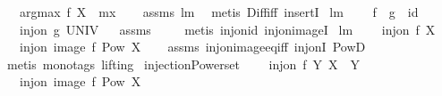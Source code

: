 \begin{isabellebody}
\ \ \ {\isachardoublequoteopen}argmax\ f\ X\ {\isacharequal}\ {\isacharbraceleft}mx{\isacharbraceright}{\isachardoublequoteclose}\isanewline
%
\isadelimproof
\ \ %
\endisadelimproof
%
\isatagproof
{}\isamarkupfalse%
\ assms\ lm{}{}{}\ \isamarkupfalse%
\ {\isacharparenleft}metis\ Diff{\isacharunderscore}iff\ insertI{}{\isacharparenright}%
\endisatagproof
{\isafoldproof}%
%
\isadelimproof
\isanewline
%
\endisadelimproof
\isanewline
{}\isamarkupfalse%
\ lm{}{}{}{\isacharcolon}\ \isanewline
\ \ \ {\isachardoublequoteopen}f\ {\isasymcirc}\ g\ {\isacharequal}\ id{\isachardoublequoteclose}\ \isanewline
\ \ \ {\isachardoublequoteopen}inj{\isacharunderscore}on\ g\ UNIV{\isachardoublequoteclose}%
\isadelimproof
\ %
\endisadelimproof
%
\isatagproof
{}\isamarkupfalse%
\ assms\ \isanewline
\ \ \isamarkupfalse%
\ {\isacharparenleft}metis\ inj{\isacharunderscore}on{\isacharunderscore}id\ inj{\isacharunderscore}on{\isacharunderscore}imageI{}{\isacharparenright}%
\endisatagproof
{\isafoldproof}%
%
\isadelimproof
%
\endisadelimproof
\isanewline
\isanewline
\isanewline
{}\isamarkupfalse%
\ lm{}{}{}{\isacharcolon}\ \isanewline
\ \ \ {\isachardoublequoteopen}inj{\isacharunderscore}on\ f\ X{\isachardoublequoteclose}\ \isanewline
\ \ \ {\isachardoublequoteopen}inj{\isacharunderscore}on\ {\isacharparenleft}image\ f{\isacharparenright}\ {\isacharparenleft}Pow\ X{\isacharparenright}{\isachardoublequoteclose}\isanewline
%
\isadelimproof
\ \ %
\endisadelimproof
%
\isatagproof
{}\isamarkupfalse%
\ assms\ inj{\isacharunderscore}on{\isacharunderscore}image{\isacharunderscore}eq{\isacharunderscore}iff\ inj{\isacharunderscore}onI\ PowD\ \isamarkupfalse%
\ {\isacharparenleft}metis\ {\isacharparenleft}mono{\isacharunderscore}tags{\isacharcomma}\ lifting{\isacharparenright}{\isacharparenright}%
\endisatagproof
{\isafoldproof}%
%
\isadelimproof
\isanewline
%
\endisadelimproof
\isanewline
{}\isamarkupfalse%
\ injectionPowerset{\isacharcolon}\ \isanewline
\ \ \ {\isachardoublequoteopen}inj{\isacharunderscore}on\ f\ Y{\isachardoublequoteclose}\ {\isachardoublequoteopen}X\ {\isasymsubseteq}\ Y{\isachardoublequoteclose}\ \isanewline
\ \ \ {\isachardoublequoteopen}inj{\isacharunderscore}on\ {\isacharparenleft}image\ f{\isacharparenright}\ {\isacharparenleft}Pow\ X{\isacharparenright}{\isachardoublequoteclose}\isanewline

\end{isabellebody}
